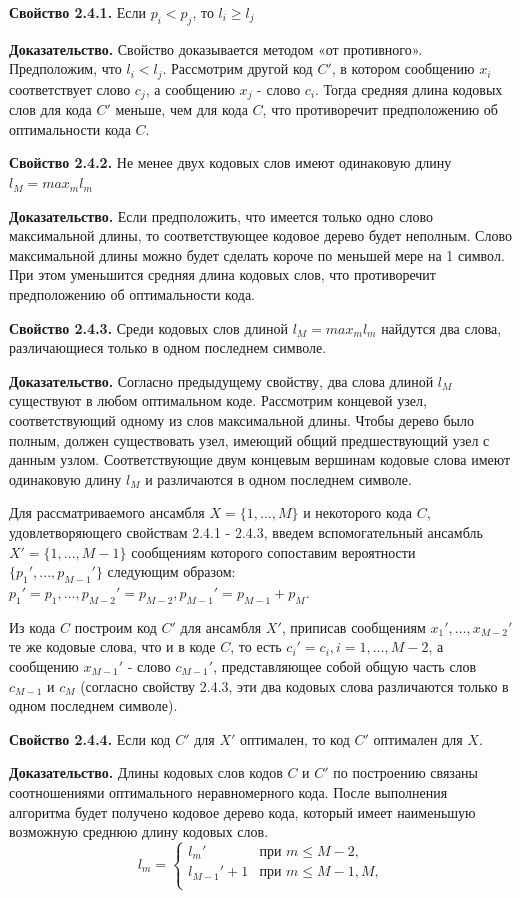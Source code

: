 \documentclass[14pt]{article}
\begin{document}
\textbf{Свойство 2.4.1.} Если \(p_i < p_j\), то \(l_i \geq l_j\)

\textbf{Доказательство.} Свойство доказывается методом «от противного». Предположим, что \(l_i < l_j\). Рассмотрим другой код \(C'\), в котором сообщению \(x_i\) соответствует слово \(c_j\), а сообщению \(x_j\) - слово \(c_i\). Тогда средняя длина кодовых слов для кода \(C'\) меньше, чем для кода \(C\), что противоречит предположению об оптимальности кода \(C\).

\textbf{Свойство 2.4.2.} Не менее двух кодовых слов имеют одинаковую длину \(l_M = max_m l_m\)

\textbf{Доказательство.} Если предположить, что имеется только одно слово максимальной длины, то соответствующее кодовое дерево будет неполным. Слово максимальной длины можно будет сделать короче по меньшей мере на 1 символ. При этом уменьшится средняя длина кодовых слов, что противоречит предположению об оптимальности кода.

\textbf{Свойство 2.4.3.} Среди кодовых слов длиной \(l_M = max_m l_m\) найдутся два слова, различающиеся только в одном последнем символе.

\textbf{Доказательство.} Согласно предыдущему свойству, два слова длиной \(l_M\) существуют в любом оптимальном коде. Рассмотрим концевой узел, соответствующий одному из слов максимальной длины. Чтобы дерево было полным, должен существовать узел, имеющий общий предшествующий узел с данным узлом. Соответствующие двум концевым вершинам кодовые слова имеют одинаковую длину \(l_M\) и различаются в одном последнем символе.

Для рассматриваемого ансамбля \(X = \{1,...,M\}\) и некоторого кода \(C\), удовлетворяющего свойствам 2.4.1 - 2.4.3, введем вспомогательный ансамбль \(X' = \{1,...,M - 1\}\) сообщениям которого сопоставим вероятности \(\{p_1',...,p_{M-1}'\}\) следующим образом: \(p_1' = p_1, ..., p_{M-2}' = p_{M-2}, p_{M-1}' = p_{M-1} + p_M\).

Из кода \(C\) построим код \(C'\) для ансамбля \(X'\), приписав сообщениям \(x_1',\ldots,x_{M-2}'\) те же кодовые слова, что и в коде \(C\), то есть \(c_i' = c_i, i = 1,\ldots,M - 2\), а сообщению \(x_{M-1}'\) - слово \(c_{M-1}'\), представляющее собой общую часть слов \(c_{M-1}\) и \(c_M\) (согласно свойству 2.4.3, эти два кодовых слова различаются только в одном последнем символе).

\textbf{Свойство 2.4.4.} Если код \(C'\) для \(X'\) оптимален, то код \(C'\) оптимален для \(X\).

\textbf{Доказательство.} Длины кодовых слов кодов \(C\) и \(C'\) по построению связаны соотношениями оптимального неравномерного кода. После выполнения алгоритма будет получено кодовое дерево кода, который имеет наименьшую возможную среднюю длину кодовых слов.
\begin{displaymath}
l_m = \left\{ \begin{array}{ll}
    l_m' & \textrm{при \(m \leq M - 2\),}\\
    l_{M-1}' + 1 & \textrm{при \(m \leq M - 1, M\),}\\
  \end{array} \right.
\end{displaymath}
\end{document}
